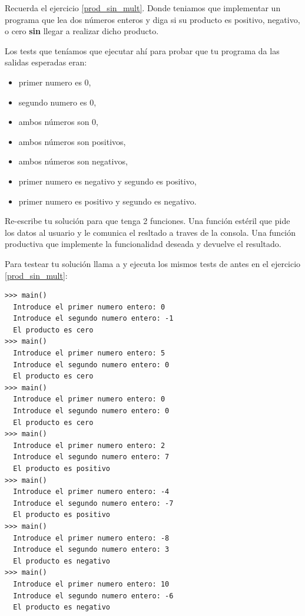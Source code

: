 \begin{ejercicio}\label{prod_sin_mult_funciones}
Recuerda el ejercicio \ref{prod_sin_mult}. Donde teniamos que 
implementar un programa que lea dos números enteros y diga si su producto es positivo, negativo, o cero \textbf{sin} llegar a realizar dicho producto. 

Los tests que teníamos que ejecutar ahí para probar que tu programa da las salidas esperadas eran: 
\begin{itemize}
\item primer numero es 0, 
\item segundo numero es 0, 
\item ambos números son 0, 
\item ambos números son positivos, 
\item ambos números son negativos, 
\item primer numero es negativo y segundo es positivo, 
\item primer numero es positivo y segundo es negativo.
\end{itemize}

Re-escribe tu solución para que tenga 2 funciones. Una función estéril  que pide los datos al usuario y le comunica el resltado a traves de la consola. Una función productiva  que implemente la funcionalidad deseada y devuelve el resultado.

Para testear tu solución llama a  y ejecuta los mismos tests de antes en el ejercicio \ref{prod_sin_mult}:\\

\begin{Verbatim}[frame=single, label={\em ejemplos y posibles tests de ejecución}]
>>> main()
  Introduce el primer numero entero: 0
  Introduce el segundo numero entero: -1
  El producto es cero
>>> main() 
  Introduce el primer numero entero: 5
  Introduce el segundo numero entero: 0
  El producto es cero
>>> main() 
  Introduce el primer numero entero: 0
  Introduce el segundo numero entero: 0
  El producto es cero
>>> main() 
  Introduce el primer numero entero: 2
  Introduce el segundo numero entero: 7
  El producto es positivo
>>> main()  
  Introduce el primer numero entero: -4
  Introduce el segundo numero entero: -7
  El producto es positivo
>>> main()  
  Introduce el primer numero entero: -8
  Introduce el segundo numero entero: 3
  El producto es negativo
>>> main()  
  Introduce el primer numero entero: 10
  Introduce el segundo numero entero: -6
  El producto es negativo
\end{Verbatim}
\end{ejercicio}


